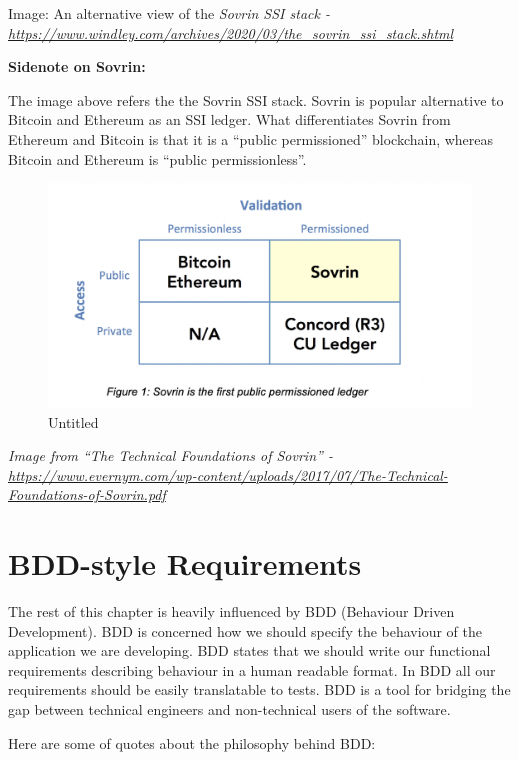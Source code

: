 Image: An alternative view of the \emph{Sovrin SSI stack -
\url{https://www.windley.com/archives/2020/03/the_sovrin_ssi_stack.shtml}}

\textbf{Sidenote on Sovrin:}

The image above refers the the Sovrin SSI stack. Sovrin is popular
alternative to Bitcoin and Ethereum as an SSI ledger. What
differentiates Sovrin from Ethereum and Bitcoin is that it is a ``public
permissioned'' blockchain, whereas Bitcoin and Ethereum is ``public
permissionless''.

\begin{figure}
\centering
\includegraphics{Functional Requirements b66771c223f2424c9b1ba3285a2ba469/Untitled 1.png}
\caption{Untitled}
\end{figure}

\emph{Image from ``The Technical Foundations of Sovrin'' -
\url{https://www.evernym.com/wp-content/uploads/2017/07/The-Technical-Foundations-of-Sovrin.pdf}}

\hypertarget{bdd-style-requirements}{%
\section{BDD-style Requirements}\label{bdd-style-requirements}}

The rest of this chapter is heavily influenced by BDD (Behaviour Driven
Development). BDD is concerned how we should specify the behaviour of
the application we are developing. BDD states that we should write our
functional requirements describing behaviour in a human readable format.
In BDD all our requirements should be easily translatable to tests. BDD
is a tool for bridging the gap between technical engineers and
non-technical users of the software.

Here are some of quotes about the philosophy behind BDD:

